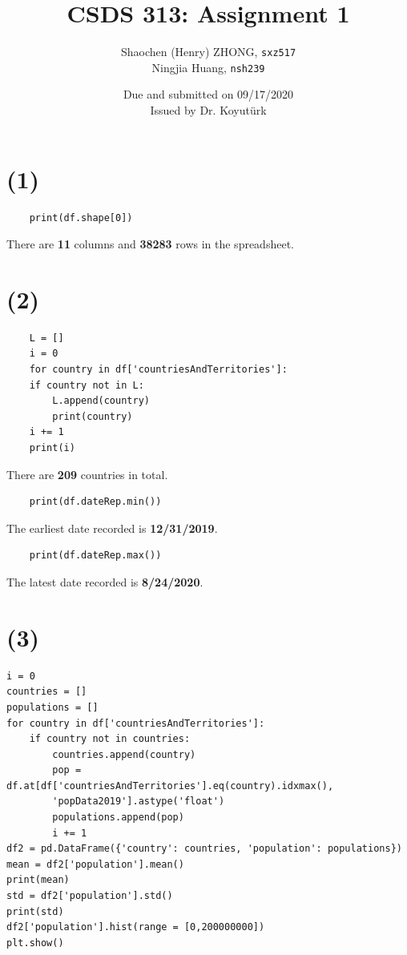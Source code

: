 \documentclass[12pt]{article}
\newcommand{\ilc}{\texttt}
\begin{document}
\title{\textbf{CSDS 313: Assignment 1}}

\author{Shaochen (Henry) ZHONG, \ilc{sxz517} \\Ningjia Huang, \ilc{nsh239}}
\date{Due and submitted on 09/17/2020 \\ Issued by Dr. Koyut{\"u}rk}
\maketitle




\section*{(1)}
\begin{lstlisting}
    print(df.shape[0])
\end{lstlisting}

There are \textbf{11} columns and \textbf{38283} rows in the spreadsheet.

\section*{(2)}
\begin{lstlisting}
    L = []
    i = 0
    for country in df['countriesAndTerritories']:
    if country not in L:
        L.append(country)
        print(country)
    i += 1
    print(i)
\end{lstlisting}

There are \textbf{209} countries in total.

\begin{lstlisting}
    print(df.dateRep.min())
\end{lstlisting}

The earliest date recorded is \textbf{12/31/2019}.

\begin{lstlisting}
    print(df.dateRep.max())
\end{lstlisting}

The latest date recorded is \textbf{8/24/2020}.

\section*{(3)}
\begin{lstlisting}
i = 0
countries = []
populations = []
for country in df['countriesAndTerritories']:
    if country not in countries:
        countries.append(country)
        pop = df.at[df['countriesAndTerritories'].eq(country).idxmax(),
        'popData2019'].astype('float')
        populations.append(pop)
        i += 1
df2 = pd.DataFrame({'country': countries, 'population': populations})
mean = df2['population'].mean()
print(mean)
std = df2['population'].std()
print(std)
df2['population'].hist(range = [0,200000000])
plt.show()
\end{lstlisting}
\end{document}
